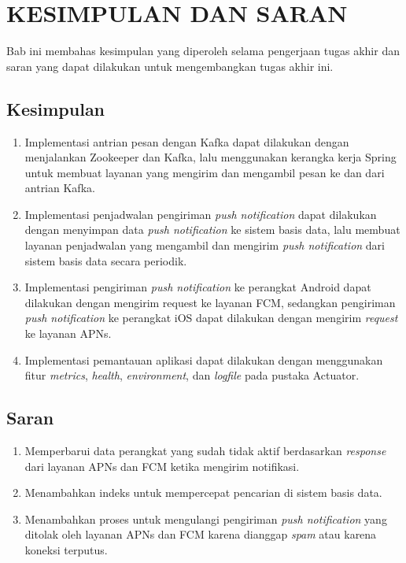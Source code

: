 \chapter{KESIMPULAN DAN SARAN}
\par Bab ini membahas kesimpulan yang diperoleh selama pengerjaan tugas akhir dan saran yang dapat dilakukan untuk mengembangkan tugas akhir ini.

\section{Kesimpulan}
\begin{enumerate}
	\item Implementasi antrian pesan dengan Kafka dapat dilakukan dengan menjalankan Zookeeper dan Kafka, lalu menggunakan kerangka kerja Spring untuk membuat layanan yang mengirim dan mengambil pesan ke dan dari antrian Kafka.
	\item Implementasi penjadwalan pengiriman \textit{push notification} dapat dilakukan dengan menyimpan data \textit{push notification} ke sistem basis data, lalu membuat layanan penjadwalan yang mengambil dan mengirim \textit{push notification} dari sistem basis data secara periodik.
	\item Implementasi pengiriman \textit{push notification} ke perangkat Android dapat dilakukan dengan mengirim request ke layanan FCM, sedangkan pengiriman \textit{push notification} ke perangkat iOS dapat dilakukan dengan mengirim \textit{request} ke layanan APNs.
	\item Implementasi pemantauan aplikasi dapat dilakukan dengan menggunakan fitur \textit{metrics}, \textit{health}, \textit{environment}, dan \textit{logfile} pada pustaka Actuator.
\end{enumerate}

\section{Saran}
\begin{enumerate}
    \item Memperbarui data perangkat yang sudah tidak aktif berdasarkan \textit{response} dari layanan APNs dan FCM ketika mengirim notifikasi.
    \item Menambahkan indeks untuk mempercepat pencarian di sistem basis data.
    \item Menambahkan proses untuk mengulangi pengiriman \textit{push notification} yang ditolak oleh layanan APNs dan FCM karena dianggap \textit{spam} atau karena koneksi terputus.
\end{enumerate}
